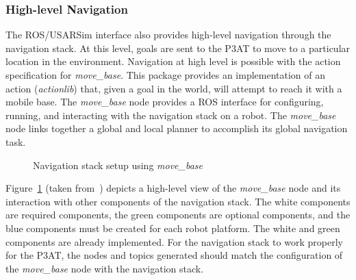 \subsubsection*{High-level Navigation}
The ROS/USARSim interface also provides high-level navigation through the navigation stack. At this level, goals are sent to the P3AT to move to a particular location in the environment. Navigation at high level is possible with the action specification for {\it move\_base}. This package provides an implementation of an action ({\it actionlib}) that, given a goal in the world, will attempt to reach it with a mobile base. The {\it move\_base} node provides a ROS interface for configuring, running, and interacting with the navigation stack on a robot. The {\it move\_base} node links together a global and local planner to accomplish its global navigation task.



\begin{figure}[t!]
\centering
{}
\caption{\label{fig:navigation_stack}Navigation stack setup using {\it move\_base}}
\end{figure}

Figure~\ref{fig:navigation_stack} (taken from~\cite{MoveBase}) depicts a high-level view of the {\it move\_base} node and its interaction with other components of the navigation stack. The white components are required components, the green components are optional components, and the blue components must be created for each robot platform. The white and green components are already implemented. For the navigation stack to work properly for the P3AT, the nodes and topics generated should match the configuration of the {\it move\_base} node with the navigation stack.



